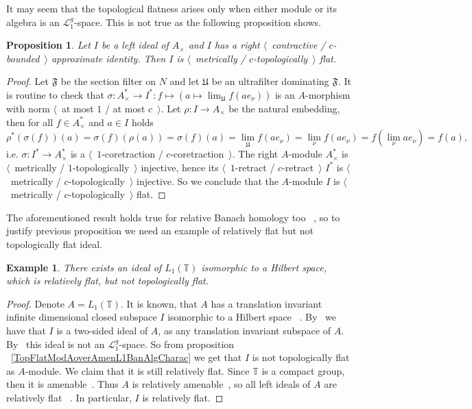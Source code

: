 \documentclass[12pt]{article}
\newtheorem{proposition}[theorem]{Proposition}
\newtheorem{example}[theorem]{Example}
\begin{document}
It may seem that the topological flatness arises only when either module or its
algebra is an $\mathcal{L}_1^g$-space. This is not true as the following
proposition shows.

\begin{proposition}\label{MetTopFlatIdealsInUnitalAlg} Let $I$ be a left ideal
of $A_\times $ and $I$ has a right $\langle$~contractive / $c$-bounded~$\rangle$
approximate identity. Then $I$ is $\langle$~metrically /
$c$-topologically~$\rangle$ flat.
\end{proposition}
\begin{proof} Let $\mathfrak{F}$ be the section filter on $N$ and let
$\mathfrak{U}$ be an ultrafilter dominating $\mathfrak{F}$. It is routine to
check that $\sigma:A_\times ^*\to I^*:f\mapsto (a\mapsto
\lim_{\mathfrak{U}}f(ae_\nu))$ is an $A$-morphism with norm $\langle$~at most
$1$ / at most $c$~$\rangle$. Let $\rho:I\to A_\times$ be the natural embedding,
then for all $f\in A_\times^*$ and $a\in I$ holds
\[
\rho^*(\sigma(f))(a)
=\sigma(f)(\rho(a))
=\sigma(f)(a)
=\lim_{\mathfrak{U}}f(a e_\nu)
=\lim_{\nu}f(a e_\nu)
=f(\lim_{\nu}a e_\nu)
=f(a),
\]
i.e. $\sigma:I^*\to A_\times^*$ is a $\langle$~$1$-coretraction /
$c$-coretraction~$\rangle$. The right $A$-module $A_\times ^*$ is
$\langle$~metrically / $1$-topologically~$\rangle$ injective, hence its
$\langle$~$1$-retract / $c$-retract~$\rangle$ $I^*$ is $\langle$~metrically /
$c$-topologically~$\rangle$ injective. So we conclude that the $A$-module $I$ is
$\langle$~metrically / $c$-topologically~$\rangle$ flat.
\end{proof}

The aforementioned result holds true for relative Banach homology too
~\cite[proposition 7.1.45]{HelBanLocConvAlg}, so to justify previous proposition
we need an example of relatively flat but not topologically flat ideal.


\begin{example} There exists an ideal of $L_1(\mathbb{T})$ isomorphic to a
Hilbert space, which is relatively flat, but not topologically flat.
\end{example}
\begin{proof}
Denote $A=L_1(\mathbb{T})$. It is known, that $A$ has a translation invariant
infinite dimensional closed subspace $I$ isomorphic to a Hilbert space
~\cite[page 52]{RosProjTransInvSbspLpG}. By~\cite[proposition 1.4.7]{KaniBanAlg}
we have that $I$ is a two-sided ideal of $A$, as any translation invariant
subspace of $A$. By~\cite[section 23.3]{DefFloTensNorOpId} this ideal is not an
$\mathcal{L}_1^g$-space. So from proposition
~\ref{TopFlatModAoverAmenL1BanAlgCharac} we get that $I$ is not topologically
flat as $A$-module. We claim that it is still relatively flat. Since
$\mathbb{T}$ is a compact group, then it is amenable~\cite[proposition
3.12.1]{PierAmenLCA}. Thus $A$ is relatively amenable~\cite[proposition
VII.1.86]{HelBanLocConvAlg}, so all left ideals of $A$ are relatively flat
~\cite[proposition VII.1.60(I)]{HelBanLocConvAlg}. In particular, $I$ is
relatively flat.
\end{proof}
\end{document}
